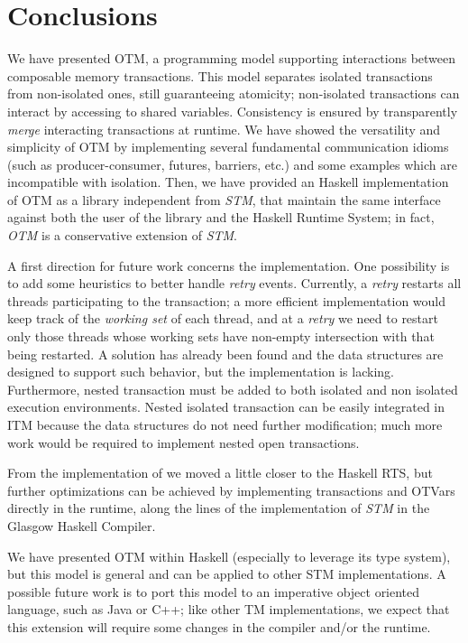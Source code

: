 
\chapter{Conclusions}
\label{chap:conc}

We have presented OTM, a programming model supporting  interactions between composable memory transactions.
This model separates isolated transactions from non-isolated ones, still guaranteeing atomicity; non-isolated transactions can interact by accessing to shared variables.
Consistency is ensured by transparently \emph{merge} interacting transactions at runtime.  
We have showed the versatility and simplicity of OTM by implementing several fundamental communication idioms (such as producer-consumer, futures, barriers, etc.) and some examples which are incompatible with isolation.
Then, we have provided an Haskell implementation of OTM as a library independent from \emph{STM}, that maintain the same interface against both the user of the library and the Haskell Runtime System; in fact, \emph{OTM} is a conservative extension of \emph{STM}.

A first direction for future work concerns the implementation.
One possibility is to add some heuristics to better handle \emph{retry} events.
Currently, a \emph{retry} restarts all threads participating to the transaction; a more efficient implementation would keep track of the \emph{working set} of each thread, and at a \emph{retry} we need to restart only those threads whose working sets have non-empty intersection with that being restarted.
A solution has already been found and the data structures are designed to support such behavior, but the implementation is lacking.
Furthermore, nested transaction must be added to both isolated and non isolated execution environments.
Nested isolated transaction can be easily integrated in ITM because the data structures do not need further modification; much more work would be required to implement nested open transactions.

From the implementation of \citet{Toneguzzo} we moved a little closer to the Haskell RTS, but further optimizations can be achieved by implementing transactions and OTVars directly in the runtime, along the lines of the implementation of \emph{STM} in the Glasgow Haskell Compiler.

We have presented OTM within Haskell (especially to leverage its type system), but this model is general and can be applied to other STM implementations. A possible future work is to port this model to an imperative object oriented language, such as Java or C++; like other TM implementations, we expect that this extension will require some changes in the compiler and/or the runtime. 